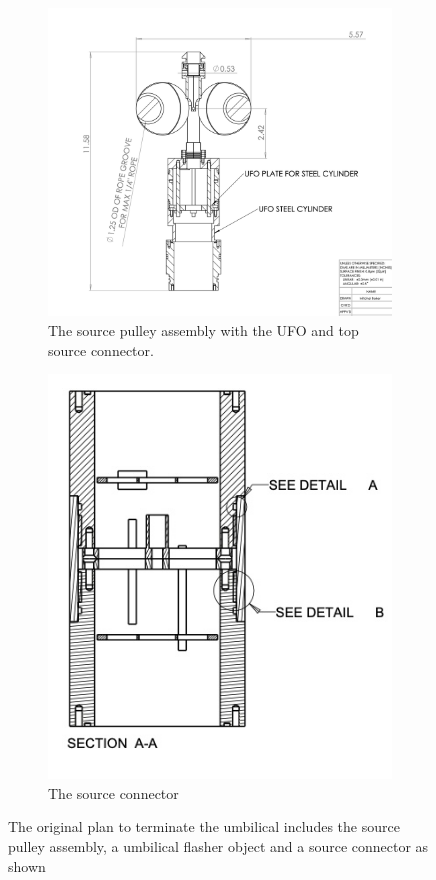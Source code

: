 \documentclass[11pt]{article}
\begin{document}
\begin{figure}
  \begin{subfigure}{0.5\textwidth}
  \includegraphics[width=\textwidth]{UFOPivotSourceConnector}
  \caption{The source pulley assembly with the UFO and top source connector.}
  \label{fig:Pivot}
\end{subfigure}
\begin{subfigure}{0.45\textwidth}
  \includegraphics[width=\textwidth]{SourceConnectorSection}
  \caption{The source connector}
  \label{fig:sourceConn}
\end{subfigure}
\caption{The original plan to terminate the umbilical includes the source pulley assembly, a umbilical flasher object and a source connector as shown}
\end{figure}
\end{document}
